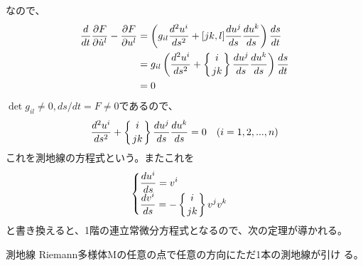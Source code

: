         なので、
        \begin{align*}
            \di{t}\pd[F]{\dot{u}^l}-\pd[F]{u^l}
            &= \lr{g_{il}\dd[u^i]{s}+[jk,l]\di[u^j]{s}\di[u^k]{s}}\di[s]{t}\\
            &= g_{il}\lr{\dd[u^i]{s}+\chr{i}{jk}\di[u^j]{s}\di[u^k]{s}}\di[s]{t}\\
            &= 0\\
        \end{align*}
        $\det g_{il}\neq 0,ds/dt=F\neq 0$であるので、
            \[\dd[u^i]{s}+\chr{i}{jk}\di[u^j]{s}\di[u^k]{s} = 0\quad (i=1,2,...,n)\]
        これを測地線の方程式という。またこれを
        \[\begin{cases}
            \displaystyle\di[u^i]{s} = v^i\\
            \displaystyle\di[v^i]{s} = -\chr{i}{jk}v^jv^k
        \end{cases}\]
        と書き換えると、1階の連立常微分方程式となるので、次の定理が導かれる。
        \begin{thm}{測地線}
            Riemann多様体Mの任意の点で任意の方向にただ1本の測地線が引け
            る。
        \end{thm}

